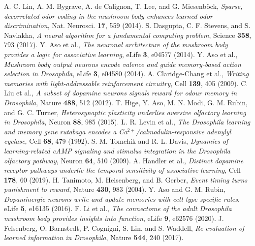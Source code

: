  A. C. Lin, A. M. Bygrave, A. de Calignon, T. Lee, and G. Miesenb\"ock, \emph{Sparse, decorrelated odor coding in the mushroom body enhances learned odor discrimination}, Nat. Neurosci. \textbf{17}, 559 (2014).
 S. Dasgupta, C. F. Stevens, and S. Navlakha, \emph{A neural algorithm for a fundamental computing problem}, Science \textbf{358}, 793 (2017).
 Y. Aso et al., \emph{The neuronal architecture of the mushroom body provides a logic for associative learning}, eLife \textbf{3}, e04577 (2014).
 Y. Aso et al., \emph{Mushroom body output neurons encode valence and guide memory-based action selection in Drosophila}, eLife \textbf{3}, e04580 (2014).
 A. Claridge-Chang et al., \emph{Writing memories with light-addressable reinforcement circuitry}, Cell \textbf{139}, 405 (2009).
 C. Liu et al., \emph{A subset of dopamine neurons signals reward for odour memory in Drosophila}, Nature \textbf{488}, 512 (2012).
 T. Hige, Y. Aso, M. N. Modi, G. M. Rubin, and G. C. Turner, \emph{Heterosynaptic plasticity underlies aversive olfactory learning in Drosophila}, Neuron \textbf{88}, 985 (2015).
 L. R. Levin et al., \emph{The Drosophila learning and memory gene rutabaga encodes a Ca$^{2+}$/calmodulin-responsive adenylyl cyclase}, Cell \textbf{68}, 479 (1992).
 S. M. Tomchik and R. L. Davis, \emph{Dynamics of learning-related cAMP signaling and stimulus integration in the Drosophila olfactory pathway}, Neuron \textbf{64}, 510 (2009).
 A. Handler et al., \emph{Distinct dopamine receptor pathways underlie the temporal sensitivity of associative learning}, Cell \textbf{178}, 60 (2019).
 H. Tanimoto, M. Heisenberg, and B. Gerber, \emph{Event timing turns punishment to reward}, Nature \textbf{430}, 983 (2004).
 Y. Aso and G. M. Rubin, \emph{Dopaminergic neurons write and update memories with cell-type-specific rules}, eLife \textbf{5}, e16135 (2016).
 F. Li et al., \emph{The connectome of the adult Drosophila mushroom body provides insights into function}, eLife \textbf{9}, e62576 (2020).
 J. Felsenberg, O. Barnstedt, P. Cognigni, S. Lin, and S. Waddell, \emph{Re-evaluation of learned information in Drosophila}, Nature \textbf{544}, 240 (2017).
